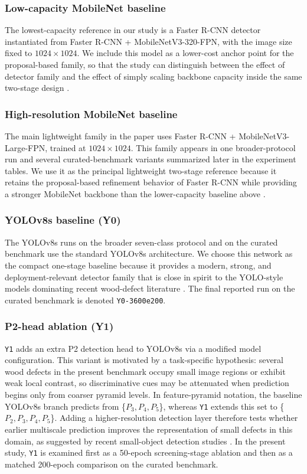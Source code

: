 \documentclass[cmc,article,submit,moreauthors,pdftex]{Definitions/tsp}
\begin{document}
\subsubsection{Low-capacity MobileNet baseline}
The lowest-capacity reference in our study is a Faster R-CNN detector instantiated from Faster R-CNN + MobileNetV3-320-FPN,  with the image size fixed to $1024 \times 1024$. We include this model as a lower-cost anchor point for the proposal-based family, so that the study can distinguish between the effect of detector family and the effect of simply scaling backbone capacity inside the same two-stage design \citep{faster_rcnn,mobilenetv3}.

\subsubsection{High-resolution MobileNet baseline}
The main lightweight family in the paper uses Faster R-CNN + MobileNetV3-Large-FPN, trained at $1024 \times 1024$. This family appears in one broader-protocol run and several curated-benchmark variants summarized later in the experiment tables. We use it as the principal lightweight two-stage reference because it retains the proposal-based refinement behavior of Faster R-CNN while providing a stronger MobileNet backbone than the lower-capacity baseline above \citep{faster_rcnn,mobilenetv3}.

\subsubsection{YOLOv8s baseline (Y0)}
The YOLOv8s runs on the broader seven-class protocol and on the curated benchmark use the standard YOLOv8s architecture. We choose this network as the compact one-stage baseline because it provides a modern, strong, and deployment-relevant detector family that is close in spirit to the YOLO-style models dominating recent wood-defect literature \citep{odca_yolo,bpn_yolo,sim_yolo,fdd_yolo}. The final reported run on the curated benchmark is denoted \texttt{Y0-3600e200}.

\subsubsection{P2-head ablation (Y1)}
\texttt{Y1} adds an extra P2 detection head to YOLOv8s via a modified model configuration. This variant is motivated by a task-specific hypothesis: several wood defects in the present benchmark occupy small image regions or exhibit weak local contrast, so discriminative cues may be attenuated when prediction begins only from coarser pyramid levels. In feature-pyramid notation, the baseline YOLOv8s branch predicts from \mbox{\{}$P_3, P_4, P_5$\mbox{\}}, whereas \texttt{Y1} extends this set to \mbox{\{}$P_2, P_3, P_4, P_5$\mbox{\}}. Adding a higher-resolution detection layer therefore tests whether earlier multiscale prediction improves the representation of small defects in this domain, as suggested by recent small-object detection studies \citep{wei_2024_smallreview,hua_2025_smallsurvey,cmc_insulator_small}. In the present study, \texttt{Y1} is examined first as a 50-epoch screening-stage ablation and then as a matched 200-epoch comparison on the curated benchmark.
\end{document}
